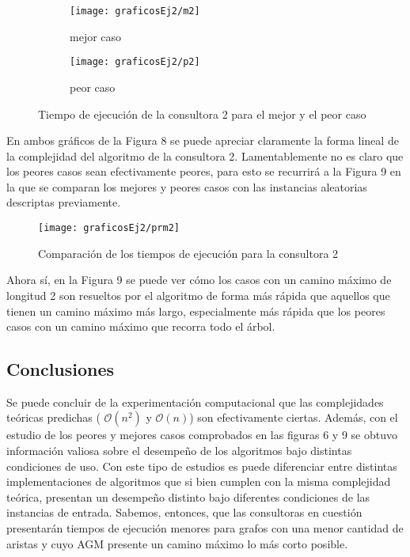 \documentclass[A4paper,oneside,fleqn,11pt]{article}
\theoremstyle{definition}
\begin{document}
\begin{figure}[H] %
    \begin{subfigure}[b]{0.45\textwidth}
        \texttt{[image: graficosEj2/m2]}
        \caption[center]{mejor caso}
        \label{ni se pa que sirve esto}
    \end{subfigure}
    \begin{subfigure}[b]{0.45\textwidth}
        \texttt{[image: graficosEj2/p2]}
        \caption{peor caso}
        \label{ni se pa que sirve esto}
    \end{subfigure}
    \caption{Tiempo de ejecución de la consultora 2 para el mejor y el peor caso}
\end{figure}

En ambos gráficos de la Figura 8 se puede apreciar claramente la forma lineal de la complejidad del algoritmo de la consultora 2. Lamentablemente no es claro que los peores casos sean efectivamente peores, para esto se recurrirá a la Figura 9 en la que se comparan los mejores y peores casos con las instancias aleatorias descriptas previamente.

\begin{figure}[H] %
    \texttt{[image: graficosEj2/prm2]}
    \label{ni se pa que sirve esto}
    \caption{Comparación de los tiempos de ejecución para la consultora 2}
\end{figure}

Ahora sí, en la Figura 9 se puede ver cómo los casos con un camino máximo de longitud 2 son resueltos por el algoritmo de forma más rápida que aquellos que tienen un camino máximo más largo, especialmente más rápida que los peores casos con un camino máximo que recorra todo el árbol.

\subsection{Conclusiones}

Se puede concluir de la experimentación computacional que las complejidades teóricas predichas ( $\mathcal{O} (n^2)$ y $\mathcal{O} (n)$)  son efectivamente ciertas. Además, con el estudio de los peores y mejores casos comprobados en las figuras 6 y 9 se obtuvo información valiosa sobre el desempeño de los algoritmos bajo distintas condiciones de uso. Con este tipo de estudios es puede diferenciar entre distintas implementaciones de algoritmos que si bien cumplen con la misma complejidad teórica, presentan un desempeño distinto bajo diferentes condiciones de las instancias de entrada. Sabemos, entonces, que las consultoras en cuestión presentarán tiempos de ejecución menores para grafos con una menor cantidad de aristas y cuyo AGM presente un camino máximo lo más corto posible.
\end{document}
